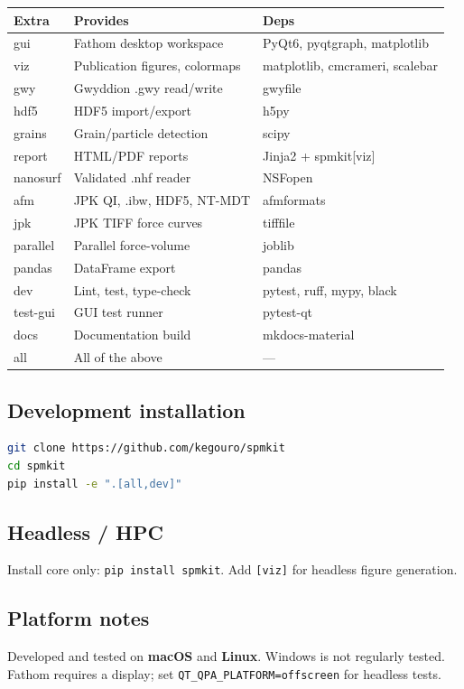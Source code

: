 \documentclass[a4paper,11pt]{article}
\begin{document}
\begin{longtable}{@{}>{\ttfamily}l p{7cm} l@{}}
\toprule
\textnormal{Extra} & \textnormal{Provides} & \textnormal{Deps} \\
\midrule
gui    & Fathom desktop workspace & PyQt6, pyqtgraph, matplotlib \\
viz    & Publication figures, colormaps & matplotlib, cmcrameri, scalebar \\
gwy    & Gwyddion .gwy read/write & gwyfile \\
hdf5   & HDF5 import/export & h5py \\
grains & Grain/particle detection & scipy \\
report & HTML/PDF reports & Jinja2 + spmkit[viz] \\
nanosurf & Validated .nhf reader & NSFopen \\
afm    & JPK QI, .ibw, HDF5, NT-MDT & afmformats \\
jpk    & JPK TIFF force curves & tifffile \\
parallel & Parallel force-volume & joblib \\
pandas & DataFrame export & pandas \\
dev    & Lint, test, type-check & pytest, ruff, mypy, black \\
test-gui & GUI test runner & pytest-qt \\
docs   & Documentation build & mkdocs-material \\
all    & All of the above & --- \\
\bottomrule
\end{longtable}

\subsection{Development installation}
\begin{lstlisting}[language=bash]
git clone https://github.com/kegouro/spmkit
cd spmkit
pip install -e ".[all,dev]"
\end{lstlisting}

\subsection{Headless / HPC}
Install core only: \texttt{pip install spmkit}. Add \texttt{[viz]} for headless figure
generation.

\subsection{Platform notes}
Developed and tested on \textbf{macOS} and \textbf{Linux}. Windows is not regularly tested.
Fathom requires a display; set \texttt{QT\_QPA\_PLATFORM=offscreen} for headless tests.
\end{document}
